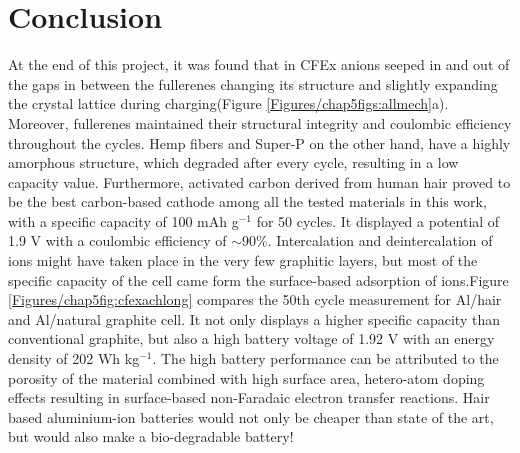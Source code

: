 \newpage
\section*{Conclusion}
At the end of this project, it was found that in CFEx  anions seeped in and out of the gaps in between the fullerenes changing its structure and slightly expanding the crystal lattice during charging(Figure \ref{Figures/chap5figs:allmech}a). Moreover, fullerenes maintained their structural integrity and coulombic efficiency throughout the cycles. Hemp fibers and Super-P on the other hand, have a highly amorphous structure, which degraded after every cycle, resulting in a low capacity value. Furthermore, activated carbon derived from human hair proved to be the best carbon-based cathode among all the tested materials in this work, with a specific capacity of 100 mAh g$^{-1}$ for 50 cycles. It displayed a potential of 1.9 V with a coulombic efficiency of $\sim$90$\%$. Intercalation and deintercalation of  ions might have taken place in the very few graphitic layers, but most of the specific capacity of the cell came form the surface-based adsorption of ions.Figure \ref{Figures/chap5fig:cfexachlong} compares the 50th cycle measurement for Al/hair and Al/natural graphite cell. It not only displays a higher specific capacity than conventional graphite, but also a high battery voltage of 1.92 V with an energy density of 202 Wh kg$^{-1}$. The high battery performance can be attributed to the porosity of the material combined with high surface area, hetero-atom doping effects resulting in surface-based non-Faradaic electron transfer reactions. Hair based aluminium-ion batteries would not only be cheaper than state of the art, but would also make a bio-degradable battery!